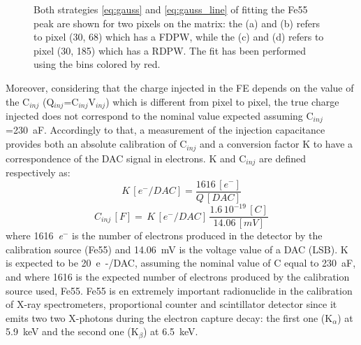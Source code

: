 \begin{figure}
\begin{subfigure}[b]{0.49\textwidth}
                \caption{}
                \label{fig:gauss_line_c185}
            \end{subfigure}
            \caption{Both strategies \ref{eq:gauss} and \ref{eq:gauss_line} of fitting the Fe55 peak are shown for two pixels on the matrix: the (a) and (b) refers to pixel (30, 68) which has a FDPW, while the (c) and (d) refers to pixel (30, 185) which has a RDPW. The fit has been performed using the bins colored by red.}
            \label{fig:Fe55_spectrum_pixels}
       \end{figure}

        Moreover, considering that the charge injected in the FE depends on the value of the C$_{inj}$ (Q$_{inj}$=C$_{inj}$V$_{inj}$) which is different from pixel to pixel, the true charge injected does not correspond to the nominal value expected assuming C$_{inj}$=\SI{230}{aF}.
        Accordingly to that, a measurement of the injection capacitance provides both an absolute calibration of C$_{inj}$ and a conversion factor K to have a correspondence of the DAC signal in electrons. 
        K and C$_{inj}$ are defined respectively as:
        \begin{equation}
            K\, [\si{\elementarycharge}^-/\si{DAC}] = \frac{1616\,[\si{\elementarycharge}^-]}{Q\,[\si{DAC}]}
        \end{equation}
        \begin{equation}
            C_{inj}\,[\si{F}] =\, K\,[\si{\elementarycharge}^-/\si{DAC}] \, \frac{1.6\,10^{-19}\,[\si{C}]}{14.06\,[\si{mV}]}
        \end{equation}
        where \SI{1616}{\elementarycharge}$^-$ is the number of electrons produced in the detector by the calibration source (Fe55) and \SI{14.06}{mV} is the voltage value of a DAC (LSB). 
        K is expected to be \SI{20}{e-/DAC}, assuming the nominal value of C equal to \SI{230}{aF}, and where 1616 is the expected number of electrons produced by the calibration source used, Fe55. Fe55 is en extremely important radionuclide in the calibration of X-ray spectrometers, proportional counter and scintillator detector since it emits two two X-photons during the electron capture decay: the first one (K$_\alpha$) at \SI{5.9}{keV} and the second one (K$_\beta$) at \SI{6.5}{keV}.

